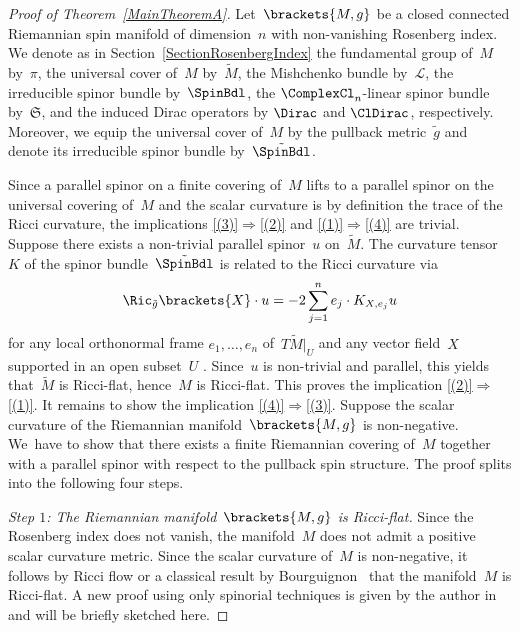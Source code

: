 \documentclass[10pt,a4paper]{amsart}
\numberwithin{equation}{section}
\newcommand{\ClSpinBdl}{\mathfrak{S}}
\begin{document}
\begin{proof}[Proof of Theorem~\ref{MainTheoremA}]
Let~$\brackets{M,g}$ be a closed connected Riemannian spin manifold of dimension~$n$ with non-vanishing Rosenberg index. We denote as in Section~\ref{SectionRosenbergIndex} the fundamental group of~$M$ by~$\pi$, the universal cover of~$M$ by~$\tilde{M}$, the Mishchenko bundle by~$\mathcal{L}$, the irreducible spinor bundle by~$\SpinBdl$, the $\ComplexCl_n$-linear spinor bundle by~$\ClSpinBdl$, and the induced Dirac operators by $\Dirac$ and $\ClDirac$, respectively. Moreover, we equip the universal cover of~$M$ by the pullback metric~$\tilde{g}$ and denote its irreducible spinor bundle by~$\tilde{\SpinBdl}$.

Since a parallel spinor on a finite covering of~$M$ lifts to a parallel spinor on the universal covering of~$M$ and the scalar curvature is by definition the trace of the Ricci curvature, the implications \ref{(3)}$\Rightarrow$\ref{(2)} and \ref{(1)}$\Rightarrow$\ref{(4)} are trivial. Suppose there exists a non-trivial parallel spinor~$u$ on~$\tilde{M}$. The curvature tensor~$K$ of the spinor bundle~$\tilde{\SpinBdl}$ is related to the Ricci curvature via
%
\begin{equation} \label{RicCurvatureRealtion}
 \Ric_{\tilde{g}} \brackets{X} \cdot u = -2 \sum_{j=1}^n e_j\cdot K_{X,e_j}u
\end{equation}
%
for any local orthonormal frame $e_1,\dots,e_n$ of~$T\tilde{M}|_U$ and any vector field~$X$ supported in an open subset~$U$ \cite[Section 3.1]{Friedrich2000}. Since~$u$ is non-trivial and parallel, this yields that~$\tilde{M}$ is Ricci-flat, hence~$M$ is Ricci-flat. This proves the implication \ref{(2)}$\Rightarrow$\ref{(1)}. It remains to show the implication \ref{(4)}$\Rightarrow$\ref{(3)}. Suppose the scalar curvature of the Riemannian manifold~$\brackets{M,g}$ is non-negative. We~have to show that there exists a finite Riemannian covering of~$M$ together with a parallel spinor with respect to the pullback spin structure. The proof splits into the following four steps.

{\it Step $1$: The Riemannian manifold~$\brackets{M,g}$ is Ricci-flat.} %
Since the Rosenberg index does not vanish, the manifold~$M$ does not admit a positive scalar curvature metric. Since the scalar curvature of~$M$ is non-negative, it follows by Ricci flow or a classical result by Bourguignon~\cite{Kazdan1975a} that the manifold~$M$ is Ricci-flat. A new proof using only spinorial techniques is given by the author in \cite[Sections~3 and~4]{Tony2025} and will be briefly sketched here.


\end{proof}
\end{document}
